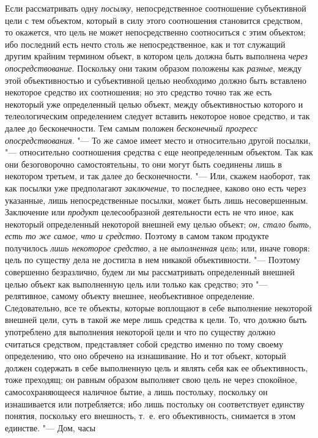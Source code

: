 {{Если рассматривать одну
{\em посылку},
непосредственное соотношение субъективной цели с тем
объектом, который в силу этого соотношения становится средством, то
окажется, что цель не может непосредственно соотноситься с этим объектом;
ибо последний есть нечто столь же непосредственное, как и тот служащий
другим крайним термином объект, в котором цель должна быть выполнена
{\em через опосредствование}.
Поскольку они таким образом положены как
{\em разные}, между этой
объективностью и субъективной целью необходимо должно быть вставлено
некоторое средство их соотношения; но это средство точно так же есть
некоторый уже определенный целью объект, между объективностью которого и
телеологическим определением следует вставить некоторое новое средство, и
так далее до бесконечности. Тем самым положен
{\em бесконечный прогресс}
{\em опосредствования}. "---
То же самое имеет место и относительно другой
посылки, "--- относительно соотношения средства с еще
неопределенным объектом. Так как они безоговорочно самостоятельны, то они
могут быть соединены лишь в некотором третьем, и так далее до
бесконечности. "--- Или, скажем наоборот, так как посылки уже
предполагают {\em заключение},
то последнее, каково оно есть через указанные, лишь
непосредственные посылки, может быть лишь несовершенным. Заключение или
{\em продукт}
целесообразной деятельности есть не что иное, как некоторый
определенный некоторой внешней ему целью объект;
{\em он, стало быть, есть то же самое,
что и средство}. Поэтому в самом таком продукте получилось
{\em лишь некоторое средство},
а не {\em выполненная
цель}; или, иначе говоря: цель по существу дела не достигла
в нем никакой объективности. "--- Поэтому совершенно
безразлично, будем ли мы рассматривать определенный внешней целью объект
как выполненную цель или только как средство; это
"--- релятивное, самому объекту внешнее, необъективное
определение. Следовательно, все те объекты, которые воплощают в себе
выполнение некоторой внешней цели, суть в такой же мере лишь средства к
цели. То, что должно быть употреблено для выполнения некоторой цели и что
по существу должно считаться средством, представляет собой средство именно
по тому своему определению, что оно обречено на изнашивание. Но и тот
объект, который должен содержать в себе выполненную цель и являть себя как
ее объективность, тоже преходящ; он равным образом выполняет свою цель не
через спокойное, самосохраняющееся наличное бытие, а лишь постольку,
поскольку он изнашивается или потребляется; ибо лишь постольку он
соответствует единству понятия, поскольку его внешность, т.~е. его
объективность, снимается в этом единстве. "--- Дом, часы
}}
